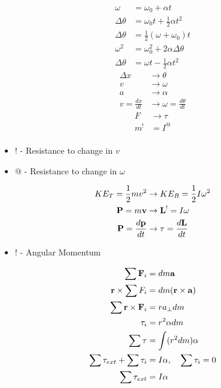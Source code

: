 \documentclass{article}
\begin{document}
\begin{align*}
	\omega & = \omega_0 + \alpha t \\
	\Delta \theta & = \omega_0 t + \frac{1}{2}\alpha t^2 \\
	\Delta \theta & = \frac{1}{2}(\omega + \omega_0)t \\
	\omega^2 & = \omega_0^2 + 2\alpha \Delta \theta \\
	\Delta \theta & = \omega t - \frac{1}{2}\alpha t^2
\end{align*}
\begin{align*}
	\Delta x & \rightarrow \theta \\
	v & \rightarrow \omega \\
	a & \rightarrow \alpha \\
	v = \frac{dx}{dt} & \rightarrow \omega = \frac{d\theta}{dt}
\end{align*}
\begin{align*}
	F & \rightarrow \tau \\
	m^{!} & = I^{@} \\
\end{align*}
\begin{itemize}
	\item ! - Resistance to change in $ v $
	\item @ - Resistance to change in $ \omega $
\end{itemize}
\begin{align*}
	KE_T = \frac{1}{2}mv^2 & \rightarrow KE_R = \frac{1}{2}I\omega^2 \\
	\vect{P} = m\vect{v} & \rightarrow \vect{L}^! = I\vect{\omega} \\
	\vect{P} = \frac{d\vect{p}}{dt} & \rightarrow \vect{\tau} = \frac{d\vect{L}}{dt}
\end{align*}
\begin{itemize}
	\item ! - Angular Momentum
\end{itemize}
\begin{align*}
	\sum \vect{F}_i & = dm\vect{a} \\
	\vect{r} \times \sum F_i & = dm(\vect{r} \times \vect{a}) \\
	\sum \vect{r} \times \vect{F}_i & = ra_{\perp}dm \\
	\tau_i & = r^2\alpha dm \\
	\sum \tau & = \int (r^2 dm)\alpha \\
	\sum \tau_{ext} + \sum \tau_{i} & = I\vect{\alpha}, \quad \sum \tau_{i} = 0 \\
	\sum \vect{\tau}_{ext} & = I\vect{\alpha}
\end{align*}
\end{document}
